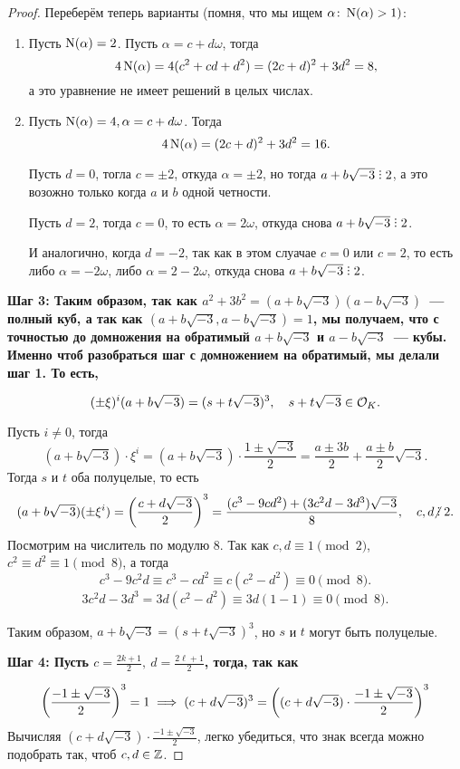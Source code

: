 \begin{proof}
 		Переберём теперь варианты (помня, что мы ищем $\alpha\colon \Nm(\alpha) > 1)$: 
 		\begin{enumerate}
 			\item Пусть $\Nm(\alpha) = 2$. Пусть $\alpha = c + d\omega$, тогда 
 			\[
 				4\Nm(\alpha) = 4(c^2 + cd + d^2) = (2c + d)^2 + 3d^2 = 8,
 			\]
 			а это уравнение не имеет решений в целых числах. 

 			\item Пусть $\Nm(\alpha) = 4, \alpha = c + d \omega$. Тогда 
 			\[
 				4\Nm(\alpha) = (2c + d)^2 + 3d^2 = 16.
 			\]

 			Пусть $d = 0$, тогла $c = \pm 2$, откуда $\alpha = \pm 2$, но тогда $a + b\sqrt{-3} \divby 2$, а это возожно только когда $a$ и $b$ одной четности. 

 			Пусть $d = 2$, тогда $c = 0$, то есть $\alpha = 2\omega$, откуда снова $a + b \sqrt{-3} \divby 2$.

 			И аналогично, когда $d = -2$, так как в этом слуачае $c = 0$ или $c = 2$, то есть либо $\alpha = -2\omega$, либо $\alpha = 2 - 2\omega$, откуда снова $a + b \sqrt{-3} \divby 2$. 
 		\end{enumerate}

 		\bf{Шаг 3:} 
 		Таким образом, так как $a^2 + 3b^2 = (a + b\sqrt{-3})(a - b\sqrt{-3})$~--- полный куб, а так как $(a + b\sqrt{-3}, a - b\sqrt{-3}) = 1$, мы получаем, что с точностью до домножения на обратимый $a + b\sqrt{-3}$ и $a - b\sqrt{-3}$~--- кубы. Именно чтоб разобраться шаг с домножением на обратимый, мы делали шаг 1. То есть, 

 		\[
 			(\pm \xi)^{i}(a + b \sqrt{-3}) = (s + t\sqrt{-3})^3, \quad s + t\sqrt{-3} \in \cO_{K}. 
 		\]

 		Пусть $i \neq 0$, тогда 
 		\[
 			(a + b\sqrt{-3}) \cdot \xi^{i} = (a + b\sqrt{-3}) \cdot \frac{1 \pm \sqrt{-3}}{2} = \frac{a \pm 3b}{2} + \frac{a \pm b}{2}\sqrt{-3}.
 		\]
 		Тогда $s$ и $t$ оба полуцелые, то есть 
 		\[
 		 	(a + b\sqrt{-3})(\pm \xi^{i}) = \lr*{\frac{c + d\sqrt{-3}}{2}}^{3} = \frac{(c^3 - 9 c d^2) + (3c^2 d - 3d^3) \sqrt{-3}}{8}, \quad c, d \notdivby 2.
 		 \] 
 		 Посмотрим на числитель по модулю 8. Так как $c, d \equiv 1 \pmod{2}$, $c^2 \equiv d^2 \equiv 1 \pmod{8}$, а тогда
 		 \[
 		 	c^3 - 9c^2 d \equiv c^3 - cd^2 \equiv c(c^2 - d^2) \equiv 0 \pmod{8}.
 		 \]
 		 \[
 		 	3c^2 d - 3d^3 = 3d(c^2 - d^2) \equiv 3d(1 - 1) \equiv 0 \pmod{8}.
 		 \]

 		 Таким образом, $a + b \sqrt{-3} = (s + t\sqrt{-3})^3$, но $s$ и $t$ могут быть полуцелые. 

 		 \bf{Шаг 4:} Пусть $c = \frac{2k + 1}{2}, \ d = \frac{2\ell + 1}{2}$, тогда, так как 

 		 \[
 			\lr*{\frac{-1 \pm \sqrt{-3}}{2}}^{3} = 1 \implies (c + d\sqrt{-3})^3 = \lr*{(c + d\sqrt{-3}) \cdot \frac{-1 \pm \sqrt{-3}}{2}}^3 
	 	\]	
	 	Вычисляя $(c + d\sqrt{-3}) \cdot \frac{-1 \pm \sqrt{-3}}{2}$, легко убедиться, что знак всегда можно подобрать так, чтоб $c, d \in \Z$.
 	\end{proof}

